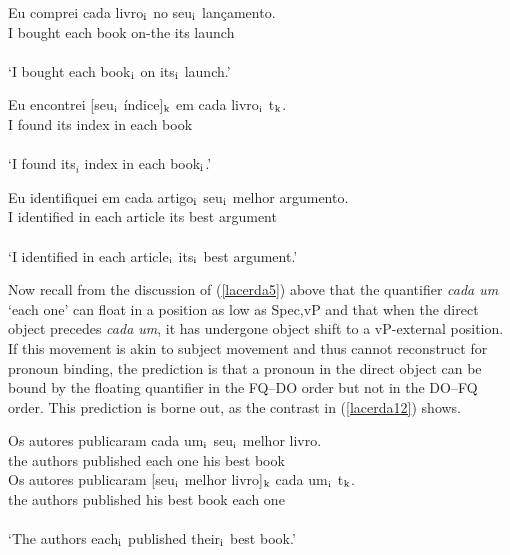 \documentclass[output=paper]{langscibook}
\begin{document}
\begin{exe}
\ex \label{lacerda10}
\begin{xlist}
\ex \label{lacerda10a}
\gll Eu 	comprei 	cada 	livro$_{\textnormal{i}}$ 	no 	seu$_{\textnormal{i}}$ 	lançamento.	\\
I 	bought 	each 	book 	on-the 	its 	launch\\\\
‘I bought each book$_{\textnormal{i}}$ on its$_{\textnormal{i}}$ launch.’

\ex \label{lacerda10b}
\gll *Eu 	encontrei 	[seu$_{\textnormal{i}}$ 	índice]$_{\textnormal{k}}$ 	em 	cada 	livro$_{\textnormal{i}}$	t$_{\textnormal{k}}$.\\
I 	found 	its 	index 	in 	each 	book\\\\
‘I found its$_{i}$ index in each book$_{\textnormal{i}}$.’\\
\end{xlist}

\ex \label{lacerda11}
\gll Eu 	identifiquei 	em	cada 	artigo$_{\textnormal{i}}$ 	seu$_{\textnormal{i}}$	melhor 	argumento.\\
I 	identified	in	each 	article 	its 	best	argument\\\\
‘I identified in each article$_{\textnormal{i}}$ its$_{\textnormal{i}}$ best argument.’
\end{exe}

Now recall from the discussion of (\ref{lacerda5}) above that the quantifier \emph{cada um} ‘each one’ can float in a position as low as Spec,vP and that when the direct object precedes \emph{cada um}, it has undergone object shift to a vP-external position. If this movement is akin to subject movement and thus cannot reconstruct for pronoun binding, the prediction is that a pronoun in the direct object can be bound by the floating quantifier in the FQ–DO order but not in the DO–FQ order. This prediction is borne out, as the contrast in (\ref{lacerda12}) shows. 

\begin{exe}
\ex \label{lacerda12}
\begin{xlist}
\ex \label{lacerda12a}
\gll Os	autores	publicaram	cada	um$_{\textnormal{i}}$	seu$_{\textnormal{i}}$	melhor	livro.\\
the	authors	published	each	one	his	best	book\\

\ex \label{lacerda12b}
\gll *Os	autores	publicaram	[seu$_{\textnormal{i}}$	melhor	livro]$_{\textnormal{k}}$	cada	um$_{\textnormal{i}}$	t$_{\textnormal{k}}$.\\
the	authors	published	his	best	book	each	one\\\\
`The authors each$_{\textnormal{i}}$ published their$_{\textnormal{i}}$ best book.’
\end{xlist}
\end{exe}
\end{document}
